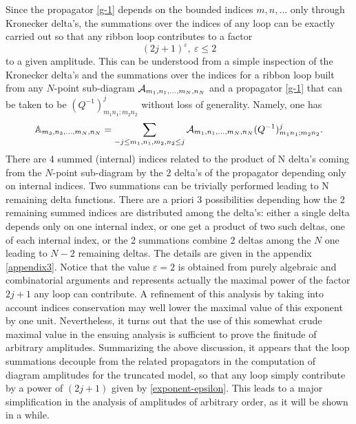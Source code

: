 \documentclass[11pt]{book}
\theoremstyle{break}
\begin{document}
Since the propagator \eqref{g-1} depends on the bounded indices $m,n,...$ only through Kronecker delta's, the summations over the indices of any loop can be exactly carried out so that any ribbon loop contributes to a factor 
\begin{equation}
(2j+1)^\varepsilon,\ \varepsilon\le2 \label{exponent-epsilon}
\end{equation}
to a given amplitude. This can be understood from a simple inspection of the Kronecker delta's and the summations over the indices for a ribbon loop built from any $N$-point sub-diagram ${\cal{A}}_{m_1,n_1,...,m_N,n_N}$ and a propagator \eqref{g-1} that can be taken to be $(Q^{-1})^j_{m_1n_1;m_2n_2}$ without loss of generality. Namely, one has
\begin{equation}
\mathbb{A}_{m_3,n_3,...,m_N,n_N}=\sum_{-j\le m_1,n_1,m_2,n_2\le j}{\cal{A}}_{m_1,n_1,...,m_N,n_N}(Q^{-1})^j_{m_1n_1;m_2n_2}\label{loop-sums}.
\end{equation}
There are 4 summed (internal) indices related to the product of N delta's 
coming from the $N$-point sub-diagram by the 2 delta's of the propagator depending only on internal indices. Two summations 
can be trivially performed leading to N remaining delta functions. There are a priori 3 possibilities depending how the 2 remaining summed indices are distributed among the delta's: either a single delta depends only on one internal index, or one get a product of two such deltas, one of each internal index, or
the 2 summations combine 2 deltas among the $N$ one leading to $N-2$ remaining deltas. The details are given in the appendix \ref{appendix3}. Notice that the value $\varepsilon=2$ is obtained from purely algebraic and combinatorial arguments and represents actually the maximal power of the factor $2j+1$ any loop can contribute. A refinement of this analysis by taking into account indices conservation may well lower the maximal value of this exponent by one unit. Nevertheless, it turns out that the use of this somewhat crude maximal value in the ensuing analysis is sufficient to prove the finitude of arbitrary amplitudes. Summarizing the above discussion, it appears that the loop summations decouple from the related propagators in the computation of diagram amplitudes for the truncated model, so that any loop simply contribute by a power of $(2j+1)$ given by \eqref{exponent-epsilon}. This leads to a major simplification in the analysis of amplitudes of arbitrary order, as it will be shown in a while.\par
\end{document}
